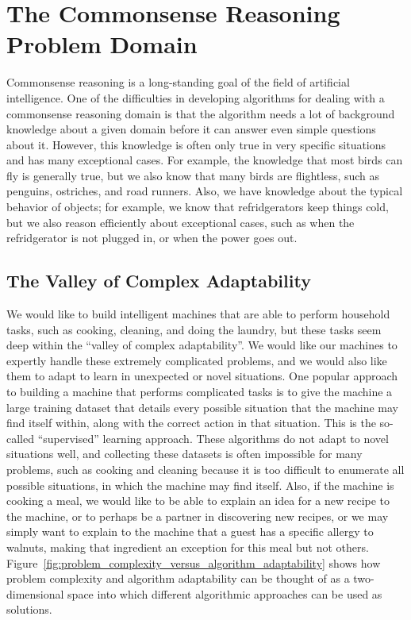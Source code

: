 \section{The Commonsense Reasoning Problem Domain}

Commonsense reasoning is a long-standing goal of the field of
artificial intelligence.  One of the difficulties in developing
algorithms for dealing with a commonsense reasoning domain is that the
algorithm needs a lot of background knowledge about a given domain
before it can answer even simple questions about it.  However, this
knowledge is often only true in very specific situations and has many
exceptional cases.  For example, the knowledge that most birds can fly
is generally true, but we also know that many birds are flightless,
such as penguins, ostriches, and road runners.  Also, we have
knowledge about the typical behavior of objects; for example, we know
that refridgerators keep things cold, but we also reason efficiently
about exceptional cases, such as when the refridgerator is not plugged
in, or when the power goes out.

\subsection{The Valley of Complex Adaptability}

We would like to build intelligent machines that are able to perform
household tasks, such as cooking, cleaning, and doing the laundry, but
these tasks seem deep within the ``valley of complex adaptability''.
We would like our machines to expertly handle these extremely
complicated problems, and we would also like them to adapt to learn in
unexpected or novel situations.  One popular approach to building a
machine that performs complicated tasks is to give the machine a large
training dataset that details every possible situation that the
machine may find itself within, along with the correct action in that
situation.  This is the so-called ``supervised'' learning approach.
These algorithms do not adapt to novel situations well, and collecting
these datasets is often impossible for many problems, such as cooking
and cleaning because it is too difficult to enumerate all possible
situations, in which the machine may find itself.  Also, if the
machine is cooking a meal, we would like to be able to explain an idea
for a new recipe to the machine, or to perhaps be a partner in
discovering new recipes, or we may simply want to explain to the
machine that a guest has a specific allergy to walnuts, making that
ingredient an exception for this meal but not others.
Figure~\ref{fig:problem_complexity_versus_algorithm_adaptability}
shows how problem complexity and algorithm adaptability can be thought
of as a two-dimensional space into which different algorithmic
approaches can be used as solutions.

